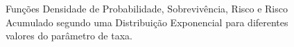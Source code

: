 \documentclass[
  12pt,
  letterpaper,
  DIV=11,
  numbers=noendperiod]{scrreprt}
\begin{document}
\begin{figure}[H]

\caption{\label{fig-CurvasExp}Funções Densidade de Probabilidade,
Sobrevivência, Risco e Risco Acumulado segundo uma Distribuição
Exponencial para diferentes valores do parâmetro de taxa.}

\begin{minipage}{0.50\linewidth}



\end{minipage}%
%
\begin{minipage}{0.50\linewidth}

\end{minipage}
\end{figure}
\end{document}
